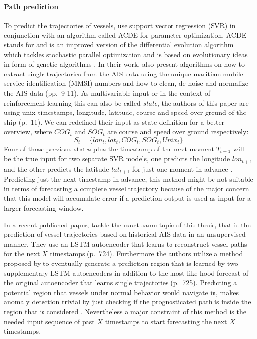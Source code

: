 \paragraph{Path prediction}
To predict the trajectories of vessels, \cite{liu2019vessel} use support vector regression (SVR) in conjunction with an algorithm called ACDE for  parameter optimization. ACDE stands for  and is an improved version of the differential evolution algorithm which tackles stochastic parallel optimization and is based on evolutionary ideas in form of genetic algorithms \cite[pp.~1-3]{thangaraj2009simple}. In their work, \cite{liu2019vessel} also present algorithms on how to extract single trajectories from the AIS data using the unique maritime mobile service identification (MMSI) numbers and how to clean, de-noise and normalize the AIS data (pp.~9-11). As multivariable input or in the context of reinforcement learning this can also be called \textit{state}, the authors of this paper are using unix timestamps, longitude, latitude, course and speed over ground of the ship (p.~11). We can redefined their input as state definition for a better overview, where $COG_t$ and $SOG_t$ are course and speed over ground respectively:
\begin{equation}
S_t = \{lon_t, lat_t, COG_t, SOG_t, Unix_t\}
\end{equation}
Four of those previous states plus the timestamp of the next moment $T_{t+1}$ will be the true input for two separate SVR models, one predicts the longitude $lon_{t+1}$ and the other predicts the latitude $lat_{t+1}$ for just one moment in advance \cite[p.~11]{liu2019vessel}. Predicting just the next timestamp in advance, this method might be not suitable in terms of forecasting a complete vessel trajectory because of the major concern that this model will accumulate error if a prediction output is used as input for a larger forecasting window.
\par
In a recent published paper, \cite{venskus2021unsupervised} tackle the exact same topic of this thesis, that is the prediction of vessel trajectories based on historical AIS data in an unsupervised manner. They use an LSTM autoencoder that learns to reconstruct vessel paths for the next $X$ timestamps (p.~724). Furthermore the authors utilize a method proposed by \cite{cruz2019} to eventually generate a prediction region that is learned by two supplementary LSTM autoencoders in addition to the  most like-hood forecast of the original autoencoder that learns single trajectories (p.~725). Predicting a potential region that vessels under normal behavior would navigate in, makes anomaly detection trivial by just checking if the prognosticated path is inside the region that is considered . Nevertheless a major constraint of this method is the needed input sequence of past $X$ timestamps to start forecasting the next $X$ timestamps.
